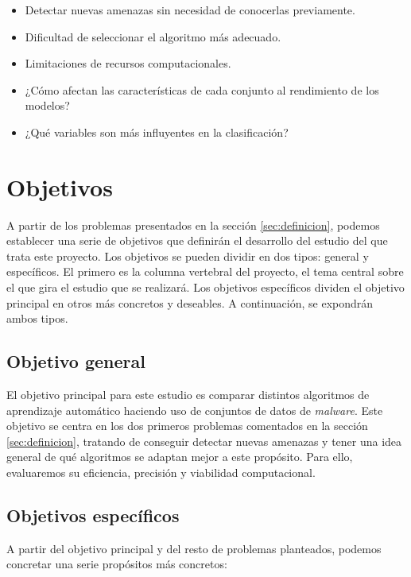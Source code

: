 \begin{itemize}
	\item Detectar nuevas amenazas sin necesidad de conocerlas previamente.
	\item Dificultad de seleccionar el algoritmo más adecuado.
	\item Limitaciones de recursos computacionales.
	\item ¿Cómo afectan las características de cada conjunto al rendimiento de los modelos?
	\item ¿Qué variables son más influyentes en la clasificación?
\end{itemize}

\section{Objetivos}
\label{sec:objetivos}

A partir de los problemas presentados en la sección \ref{sec:definicion}, podemos establecer una serie de objetivos que definirán el desarrollo del estudio del que trata este proyecto. Los objetivos se pueden dividir en dos tipos: general y específicos. El primero es la columna vertebral del proyecto, el tema central sobre el que gira el estudio que se realizará. Los objetivos específicos dividen el objetivo principal en otros más concretos y deseables. A continuación, se expondrán ambos tipos.

\subsection{Objetivo general}
\label{subsec:obj_gen}

El objetivo principal para este estudio es comparar distintos algoritmos de aprendizaje automático haciendo uso de conjuntos de datos de \textit{malware}. Este objetivo se centra en los dos primeros problemas comentados en la sección \ref{sec:definicion}, tratando de conseguir detectar nuevas amenazas y tener una idea general de qué algoritmos se adaptan mejor a este propósito. Para ello, evaluaremos su eficiencia, precisión y viabilidad computacional.

\subsection{Objetivos específicos}
\label{subsec:obj_esp}

A partir del objetivo principal y del resto de problemas planteados, podemos concretar una serie propósitos más concretos:

